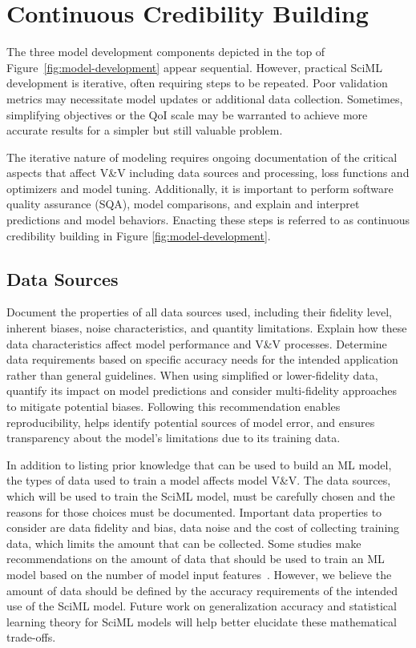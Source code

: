 \section{Continuous Credibility Building}
\label{sec:ongoing}

The three model development components depicted in the top of Figure~\ref{fig:model-development} appear sequential. 
However, practical SciML development is iterative, often requiring steps to be repeated.
Poor validation metrics may necessitate model updates or additional data collection. 
Sometimes, simplifying objectives or the QoI scale may be warranted to achieve more accurate results for a simpler but still valuable problem. 

The iterative nature of modeling requires ongoing documentation of the critical aspects that affect V\&V including data sources and processing, loss functions and optimizers and model tuning. Additionally, it is important to perform software quality assurance (SQA), model comparisons, and explain and interpret predictions and model behaviors. Enacting these steps is referred to as continuous credibility building in Figure \ref{fig:model-development}.

\subsection{Data Sources}
\label{sec:data-sources}

\begin{essrec}
Document the properties of all data sources used, including their fidelity level, inherent biases, noise characteristics, and quantity limitations. Explain how these data characteristics affect model performance and V\&V processes. Determine data requirements based on specific accuracy needs for the intended application rather than general guidelines. When using simplified or lower-fidelity data, quantify its impact on model predictions and consider multi-fidelity approaches to mitigate potential biases.
Following this recommendation enables reproducibility, helps identify potential sources of model error, and ensures transparency about the model's limitations due to its training data.
\end{essrec}


In addition to listing prior knowledge that can be used to build an ML model, the types of data used to train a model affects model V\&V. The data sources, which will be used to train the SciML model, must be carefully chosen and the reasons for those choices must be documented. Important data properties to consider are data fidelity and bias, data noise and the cost of collecting training data, which limits the amount that can be collected. Some studies make recommendations on the amount of data that should be used to train an ML model based on the number of model input features~\cite{Zhu_YR_EST_2023}. However, we believe the amount of data should be defined by the accuracy requirements of the intended use of the SciML model. Future work on generalization accuracy and statistical learning theory for SciML models will help better elucidate these mathematical trade-offs.

